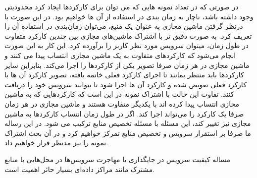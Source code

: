 در صورتی که در تعداد نمونه هایی که می توان برای کارکردها ایجاد کرد محدودیتی وجود داشته باشد، ناچار به زمان بندی در استفاده از آن ها خواهیم بود.
در این صورت با درنظر گرفتن ماشین مجازی به عنوان یک منبع، می‌توان زمان‌بندی در استفاده آن را تعریف کرد.
به صورت دقیق تر با اشتراک ماشین‌های مجازی بین چندین کارکرد متفاوت در طول زمان، میتوان سرویس مورد نظر کاربر را برآورده کرد.
این کار به این صورت انجام می‌شود که کارکردهای متفاوت به یک ماشین مجازی انتساب پیدا می کنند و ماشین مجازی در هر زمان صرفا تصویر یکی از کارکردها را اجرا می‌کند.
بنابراین سایر کارکردها باید منتظر بمانند تا اجرای کارکرد فعلی خاتمه یافته، تصویر کارکرد آن ها با کارکرد فعلی تعویض شده و کارکرد آن ها اجرا شود تا بتوانند سرویس خود را دریافت کنند.
تفاوت این حالت با اشتراک نمونه در این است که کارکردهایی که به ماشین مجازی انتساب پیدا کرده اند با یکدیگر متفاوت هستند و ماشین مجازی در هر زمان صرفا یک کارکرد را می‌تواند اجرا کند.
اگر در طول زمان انتساب کارکردها به ماشین مجازی نیز تغییر کند، این مسئله با مسئله تخصیص منابع ترکیب می شود.
در این رساله ما صرفا بر استقرار سرویس و تخصیص منابع تمرکز خواهیم کرد و در آن بحث اشتراک نمونه را نیز مدنظر قرار خواهیم داد.

مساله کیفیت سرویس در جایگذاری یا مهاجرت سرویس‌ها در محل‌هایی با منابع مشترک مانند مراکز داده‌ای بسیار حائر اهمیت است.

